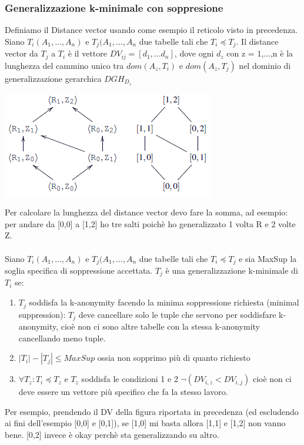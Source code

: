 \subsubsection{Generalizzazione k-minimale con soppresione}
Definiamo il Distance vector usando come esempio il reticolo visto in precedenza.\\
Siano \(T_i(A_1,...,A_n)\) e \(T_j(A_1,...,A_n\) due tabelle tali che \(T_i \preceq T_j\). Il distance vector da \(T_j\) a \(T_i\) è il vettore \(DV_{ij}=[d_1,...d_n]\), dove ogni \(d_z\) con z = 1,...,n è la lunghezza del cammino unico tra \(dom(A_z, T_i)\) e \(dom(A_z,T_j)\) nel dominio di generalizzazione gerarchica \(DGH_D_z\)
\begin{center}
    \includegraphics[scale=0.7]{img/dv.png}
\end{center}
Per calcolare la lunghezza del distance vector devo fare la somma, ad esempio: per andare da [0,0] a [1,2] ho tre salti poichè ho generalizzato 1 volta R e 2 volte Z.\\\\
Siano \(T_i(A_1,...,A_n)\) e \(T_j(A_1,...,A_n\) due tabelle tali che \(T_i \preceq T_j\) e sia MaxSup la soglia specifica di soppressione accettata. \(T_j\) è una generalizzazione k-minimale di \(T_i\) se:
\begin{enumerate}
    \item \(T_j\) soddisfa la k-anonymity facendo la minima soppressione richiesta (minimal suppression): \(T_j\) deve cancellare solo le tuple che servono per soddisfare k-anonymity, cioè non ci sono altre tabelle con la stessa k-anonymity cancellando meno tuple.
    \item \(|T_i| - |T_j| \leq MaxSup \) ossia non sopprimo più di quanto richiesto
    \item \(\forall T_z: T_i \preceq T_z\) e \(T_z\) soddisfa le condizioni 1 e 2 \Longrightarrow \(\lnot (DV_{i,z} < DV_{i,j}) \) cioè non ci deve essere un vettore più specifico che fa la stesso lavoro. 
\end{enumerate}
Per esempio, prendendo il DV della figura riportata in precedenza (ed escludendo ai fini dell'esempio [0,0] e [0,1]), se [1,0] mi basta allora [1,1] e [1,2] non vanno bene. [0,2] invece è okay perchè sta generalizzando su altro.
